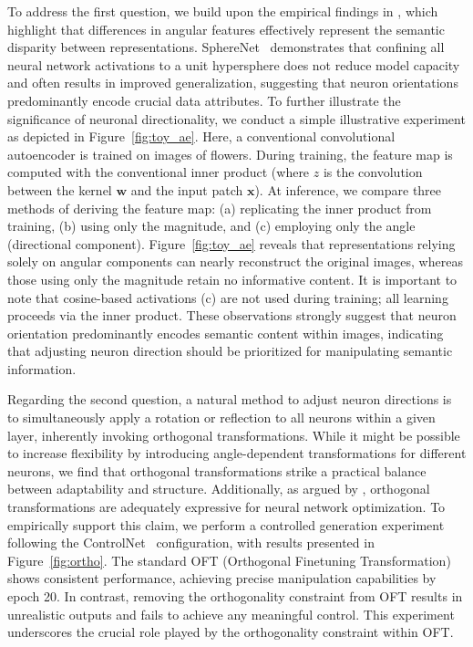 To address the first question, we build upon the empirical findings in \cite{liu2018decoupled,chen2020angular}, which highlight that differences in angular features effectively represent the semantic disparity between representations. SphereNet~\cite{liu2017deep} demonstrates that confining all neural network activations to a unit hypersphere does not reduce model capacity and often results in improved generalization, suggesting that neuron orientations predominantly encode crucial data attributes. To further illustrate the significance of neuronal directionality, we conduct a simple illustrative experiment as depicted in Figure~\ref{fig:toy_ae}. Here, a conventional convolutional autoencoder is trained on images of flowers. During training, the feature map is computed with the conventional inner product (where $z$ is the convolution between the kernel $\bm{w}$ and the input patch $\bm{x}$). At inference, we compare three methods of deriving the feature map: (a) replicating the inner product from training, (b) using only the magnitude, and (c) employing only the angle (directional component). Figure~\ref{fig:toy_ae} reveals that representations relying solely on angular components can nearly reconstruct the original images, whereas those using only the magnitude retain no informative content. It is important to note that cosine-based activations (c) are not used during training; all learning proceeds via the inner product. These observations strongly suggest that neuron orientation predominantly encodes semantic content within images, indicating that adjusting neuron direction should be prioritized for manipulating semantic information.

Regarding the second question, a natural method to adjust neuron directions is to simultaneously apply a rotation or reflection to all neurons within a given layer, inherently invoking orthogonal transformations. While it might be possible to increase flexibility by introducing angle-dependent transformations for different neurons, we find that orthogonal transformations strike a practical balance between adaptability and structure. Additionally, as argued by \cite{liu2021orthogonal}, orthogonal transformations are adequately expressive for neural network optimization. To empirically support this claim, we perform a controlled generation experiment following the ControlNet~\cite{zhang2023adding} configuration, with results presented in Figure~\ref{fig:ortho}. The standard OFT (Orthogonal Finetuning Transformation) shows consistent performance, achieving precise manipulation capabilities by epoch 20. In contrast, removing the orthogonality constraint from OFT results in unrealistic outputs and fails to achieve any meaningful control. This experiment underscores the crucial role played by the orthogonality constraint within OFT.

